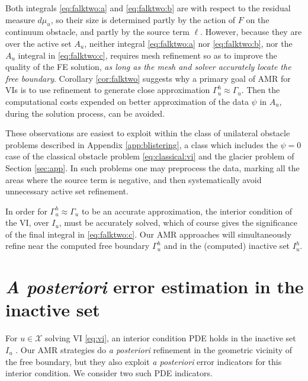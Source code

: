 \documentclass[]{interact}
\theoremstyle{plain}%
\theoremstyle{definition}
\theoremstyle{remark}
\newcommand{\cX}{\mathcal{X}}
\begin{document}
Both integrals \eqref{eq:falktwo:a} and \eqref{eq:falktwo:b} are with respect to the residual measure $d\mu_u$, so their size is determined partly by the action of $F$ on the continuum obstacle, and partly by the source term $\ell$.  However, because they are over the active set $A_u$, neither integral \eqref{eq:falktwo:a} nor \eqref{eq:falktwo:b}, nor the $A_u$ integral in \eqref{eq:falktwo:c}, requires mesh refinement so as to improve the quality of the FE solution, \emph{as long as the mesh and solver accurately locate the free boundary}.  Corollary \ref{cor:falktwo} suggests why a primary goal of AMR for VIs is to use refinement to generate close approximation $\Gamma_u^h\approx \Gamma_u$.  Then the computational costs expended on better approximation of the data $\psi$ in $A_u$, during the solution process, can be avoided.

These observations are easiest to exploit within the class of unilateral obstacle problems described in Appendix \ref{app:blistering}, a class which includes the $\psi=0$ case of the classical obstacle problem \eqref{eq:classical:vi} and the glacier problem of Section \ref{sec:app}.  In such problems one may preprocess the data, marking all the areas where the source term is negative, and then systematically avoid unnecessary active set refinement.

In order for $\Gamma_u^h\approx \Gamma_u$ to be an accurate approximation, the interior condition of the VI, over $I_u$, must be accurately solved, which of course gives the significance of the final integral in \eqref{eq:falktwo:c}.  Our AMR approaches will simultaneously refine near the computed free boundary $\Gamma_u^h$ and in the (computed) inactive set $I_u^h$.


\section{\emph{A posteriori} error estimation in the inactive set} \label{sec:inactive}

For $u\in\cX$ solving VI \eqref{eq:vi}, an interior condition PDE holds in the inactive set $I_u$ \cite{KinderlehrerStampacchia1980}.  Our AMR strategies do \emph{a posteriori} refinement in the geometric vicinity of the free boundary, but they also exploit \emph{a posteriori} error indicators for this interior condition.  We consider two such PDE indicators.
\end{document}
